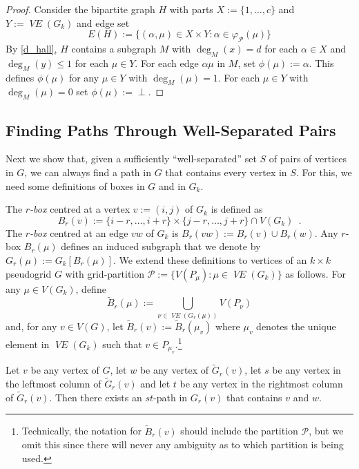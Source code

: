 \documentclass{patmorin}
\newcommand{\defin}[1]{\emph{\color{brown}#1}}
\DeclareMathOperator{\VE}{\mathit{VE}}
\begin{document}
\begin{proof}
  Consider the bipartite graph $H$ with parts $X:=\{1,\ldots,c\}$ and $Y:=\VE(G_k)$ and edge set
  \[
    E(H) := \{ (\alpha,\mu)\in X\times Y: \alpha\in\varphi_\mathcal{P}(\mu) \}
  \]
  By \cref{d_hall}, $H$ contains a subgraph $M$ with $\deg_M(x)=d$ for each $\alpha\in X$ and $\deg_M(y)\le 1$ for each $\mu\in Y$.  For each edge $\alpha\mu$ in $M$, set $\phi(\mu):=\alpha$.  This defines $\phi(\mu)$ for any $\mu\in Y$ with $\deg_M(\mu)=1$.  For each $\mu\in Y$ with $\deg_M(\mu)=0$ set $\phi(\mu):=\perp$.
\end{proof}

\subsection{Finding Paths Through Well-Separated Pairs}

Next we show that, given a sufficiently ``well-separated'' set $S$ of pairs of vertices in $G$, we can always find a path in $G$ that contains every vertex in $S$. For this, we need some definitions of boxes in $G$ and in $G_k$.

The \defin{$r$-box} centred at a vertex $v:=(i,j)$ of $G_{k}$ is defined as
\[
  B_r(v) := \{i-r,\ldots,i+r\}\times\{j-r,\ldots,j+r\} \cap V(G_{k}) \enspace .
\]
The \defin{$r$-box} centred at an edge $vw$ of $G_{k}$ is $B_r(vw):=B_r(v)\cup B_r(w)$.
Any $r$-box $B_r(\mu)$ defines an induced subgraph that we denote by $G_r(\mu):=G_{k}[B_r(\mu)]$.  We extend these definitions to vertices of an $k\times k$ pseudogrid $G$ with grid-partition $\mathcal{P}:=\{V(P_\mu):\mu\in\VE(G_k)\}$ as follows. For any $\mu\in V(G_k)$, define
\[
   \tilde{B}_r(\mu) := \bigcup_{\nu\in \VE(G_r(\mu))} V(P_\nu)
\]
and, for any $v\in V(G)$, let $\tilde{B}_r(v):=\tilde{B}_r(\mu_v)$
where $\mu_v$ denotes the unique element in $\VE(G_k)$ such that $v\in P_{\mu_v}$.\footnote{Technically, the notation for $\tilde{B}_r(v)$ should include the partition $\mathcal{P}$, but we omit this since there will never any ambiguity as to which partition is being used.}

\begin{lem}\label{pick_up_two}
  Let $v$ be any vertex of $G$, let $w$ be any vertex of $\tilde{G}_r(v)$, let $s$ be any vertex in the leftmost column of $\tilde{G}_r(v)$ and let $t$ be any vertex in the rightmost column of $\tilde{G}_r(v)$.  Then there exists an $st$-path in $G_r(v)$ that contains $v$ and $w$.
\end{lem}
\end{document}

